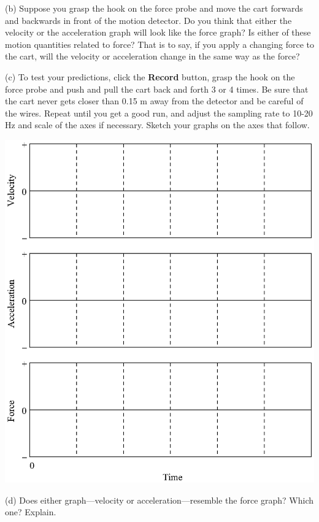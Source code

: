 \newpage
(b) Suppose you grasp the hook on the force probe and move the cart forwards
and backwards in front of the motion detector. Do you think that either the
velocity or the acceleration graph will look like the force graph? Is either
of these motion quantities related to force? That is to say, if you apply a
changing force to the cart, will the velocity or acceleration change in the
same way as the force?
\answerspace{10mm}

\pagebreak[3]
(c) To test your predictions, click the \textbf{Record} button, grasp the
hook on the force probe and push and pull the cart back and forth 3 or 4 times. Be sure that
the cart never gets closer than 0.15 m away from the detector and be careful
of the wires. Repeat until you get a good run, and adjust the sampling rate to
10-20 Hz 
and scale of the axes if necessary. Sketch your graphs on the axes that follow.

\vspace{-0.3cm}
{\par\centering \includegraphics[scale=0.95]{force1/force1_fig2.eps} \par}
\vspace{-0.4cm}

(d) Does either graph---velocity or acceleration---resemble the force graph? Which
one? Explain.
\answerspace{15mm}

